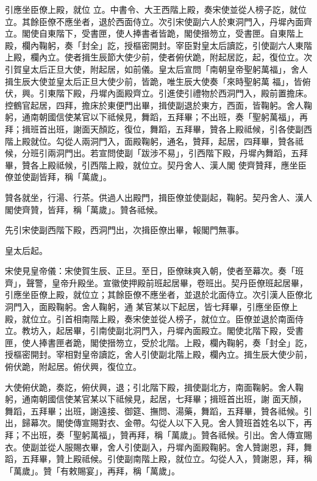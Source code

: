 \begin{pinyinscope}
 引應坐臣僚上殿，就位
 立。中書令、大王西階上殿，奏宋使並從人榜子訖，就位立。其餘臣僚不應坐者，退於西面侍立。次引宋使副六人於東洞門入，丹墀內面齊立。閣使自東階下，受書匣，使人捧書者皆跪，閣使搢笏立，受書匣。自東階上殿，欄內鞠躬，奏「封全」訖，授樞密開封。宰臣對皇太后讀訖，引使副六人東階上殿，欄內立。使者揖生辰節大使少前，使者俯伏跪，附起居訖，起，復位立。次引賀皇太后正旦大使，附起居，如前儀。皇太后宣問「南朝皇帝聖躬萬福」，舍人揖生辰大使並皇太后正旦大使少前，皆跪，唯生辰大使奏「來時聖躬萬
 福」，皆俯伏，興。引東階下殿，丹墀內面殿齊立。引進使引禮物於西洞門入，殿前置擔床。控鶴官起居，四拜，擔床於東便門出畢，揖使副退於東方，西面，皆鞠躬。舍人鞠躬，通南朝國信使某官以下祗候見，舞蹈，五拜畢；不出班，奏「聖躬萬福」，再拜；揖班首出班，謝面天顏訖，復位，舞蹈，五拜畢，贊各上殿祗候，引各使副西階上殿就位。勾從人兩洞門入，面殿鞠躬，通名，贊拜，起居，四拜畢，贊各祗候，分班引兩洞門出。若宣問使副「跋涉不易」，引西階下殿，丹墀內舞蹈，五拜畢，贊各上殿祗候，引西階上殿，就位立。契丹舍人、漢人閣
 使齊贊拜，應坐臣僚並使副皆拜，稱「萬歲」。



 贊各就坐，行湯、行茶。供過人出殿門，揖臣僚並使副起，鞠躬。契丹舍人、漢人閣使齊贊，皆拜，稱「萬歲」。贊各祗候。



 先引宋使副西階下殿，西洞門出，次揖臣僚出畢，報閣門無事。



 皇太后起。



 宋使見皇帝儀：宋使賀生辰、正旦。至日，臣僚昧爽入朝，使者至幕次。奏「班齊」，聲警，皇帝升殿坐。宣徽使押殿前班起居畢，卷班出。契丹臣僚班起居畢，引應坐臣僚上殿，就位立；其餘臣僚不應坐者，並退於北面侍立。次引漢人臣僚北洞門入，面殿鞠躬。舍人鞠躬，通
 某官某以下起居，皆七拜畢，引應坐臣僚上殿，就位立。引首相南階上殿，奏宋使並從人榜子，就位立。臣僚並退於南面侍立。教坊入，起居畢，引南使副北洞門入，丹墀內面殿立。閣使北階下殿，受書匣，使人捧書匣者跪，閣使搢笏立，受於北階。上殿，欄內鞠躬，奏「封全」訖，授樞密開封。宰相對皇帝讀訖，舍人引使副北階上殿，欄內立。揖生辰大使少前，俯伏跪，附起居。俯伏興，復位立。



 大使俯伏跪，奏訖，俯伏興，退；引北階下殿，揖使副北方，南面鞠躬。舍人鞠躬，通南朝國信使某官某以下祗候見，起居，七拜畢；揖班首出班，謝
 面天顏，舞蹈，五拜畢；出班，謝遠接、御筵、撫問、湯藥，舞蹈，五拜畢，贊各祗候。引出，歸幕次。閣使傳宣賜對衣、金帶。勾從人以下入見。舍人贊班首姓名以下，再拜；不出班，奏「聖躬萬福」，贊再拜，稱「萬歲」。贊各祗候。引出。舍人傳宣賜衣。使副並從人服賜衣畢，舍人引使副入，丹墀內面殿鞠躬。舍人贊謝恩，拜，舞蹈，五拜畢，贊上殿祗候。引使副南階上殿，就位立。勾從人入，贊謝恩，拜，稱「萬歲」。贊「有敕賜宴」，再拜，稱「萬歲」。




\end{pinyinscope}
